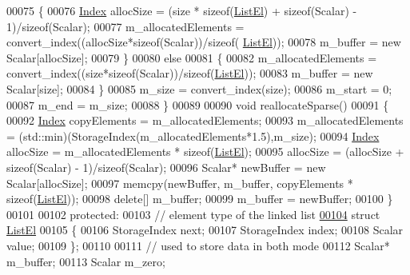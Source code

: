 \begin{DoxyCode}
00075       \{
00076         \hyperlink{namespace_eigen_a62e77e0933482dafde8fe197d9a2cfde}{Index} allocSize = (size * \textcolor{keyword}{sizeof}(\hyperlink{struct_eigen_1_1internal_1_1_ambi_vector_1_1_list_el}{ListEl}) + \textcolor{keyword}{sizeof}(Scalar) - 1)/\textcolor{keyword}{sizeof}(Scalar);
00077         m\_allocatedElements = convert\_index((allocSize*\textcolor{keyword}{sizeof}(Scalar))/\textcolor{keyword}{sizeof}(
      \hyperlink{struct_eigen_1_1internal_1_1_ambi_vector_1_1_list_el}{ListEl}));
00078         m\_buffer = \textcolor{keyword}{new} Scalar[allocSize];
00079       \}
00080       \textcolor{keywordflow}{else}
00081       \{
00082         m\_allocatedElements = convert\_index((size*\textcolor{keyword}{sizeof}(Scalar))/\textcolor{keyword}{sizeof}(\hyperlink{struct_eigen_1_1internal_1_1_ambi_vector_1_1_list_el}{ListEl}));
00083         m\_buffer = \textcolor{keyword}{new} Scalar[size];
00084       \}
00085       m\_size = convert\_index(size);
00086       m\_start = 0;
00087       m\_end = m\_size;
00088     \}
00089 
00090     \textcolor{keywordtype}{void} reallocateSparse()
00091     \{
00092       \hyperlink{namespace_eigen_a62e77e0933482dafde8fe197d9a2cfde}{Index} copyElements = m\_allocatedElements;
00093       m\_allocatedElements = (std::min)(StorageIndex(m\_allocatedElements*1.5),m\_size);
00094       \hyperlink{namespace_eigen_a62e77e0933482dafde8fe197d9a2cfde}{Index} allocSize = m\_allocatedElements * \textcolor{keyword}{sizeof}(\hyperlink{struct_eigen_1_1internal_1_1_ambi_vector_1_1_list_el}{ListEl});
00095       allocSize = (allocSize + \textcolor{keyword}{sizeof}(Scalar) - 1)/\textcolor{keyword}{sizeof}(Scalar);
00096       Scalar* newBuffer = \textcolor{keyword}{new} Scalar[allocSize];
00097       memcpy(newBuffer,  m\_buffer,  copyElements * \textcolor{keyword}{sizeof}(\hyperlink{struct_eigen_1_1internal_1_1_ambi_vector_1_1_list_el}{ListEl}));
00098       \textcolor{keyword}{delete}[] m\_buffer;
00099       m\_buffer = newBuffer;
00100     \}
00101 
00102   \textcolor{keyword}{protected}:
00103     \textcolor{comment}{// element type of the linked list}
\hyperlink{struct_eigen_1_1internal_1_1_ambi_vector_1_1_list_el}{00104}     \textcolor{keyword}{struct }\hyperlink{struct_eigen_1_1internal_1_1_ambi_vector_1_1_list_el}{ListEl}
00105     \{
00106       StorageIndex next;
00107       StorageIndex index;
00108       Scalar value;
00109     \};
00110 
00111     \textcolor{comment}{// used to store data in both mode}
00112     Scalar* m\_buffer;
00113     Scalar m\_zero;

\end{DoxyCode}
